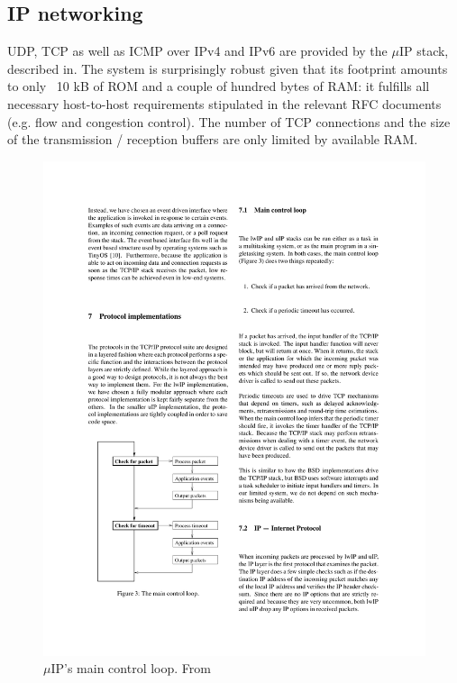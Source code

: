 \documentclass[final,a4paper,twoside,11pt,onecolumn]{report}
\begin{document}




\subsection{IP networking}
UDP, TCP as well as ICMP over IPv4 and IPv6 are provided by the $\mu$IP stack, described in\cite{dunkels2003full}. The system is surprisingly robust given that its footprint amounts to only ~10 kB of ROM and a couple of hundred bytes of RAM: it fulfills all necessary host-to-host requirements stipulated in the relevant RFC documents\citep[p.4]{dunkels2003full} (e.g. flow and congestion control). The number of TCP connections and the size of the transmission / reception buffers are only limited by available RAM.

\begin{figure}
   \centering
   \includegraphics[width=.9\linewidth]{dunkels-uip-main_loop}
   \caption{$\mu$IP's main control loop. From \citep[p.6]{dunkels2003full}}
   \label{fig:uip-ml}
\end{figure}
\end{document}

